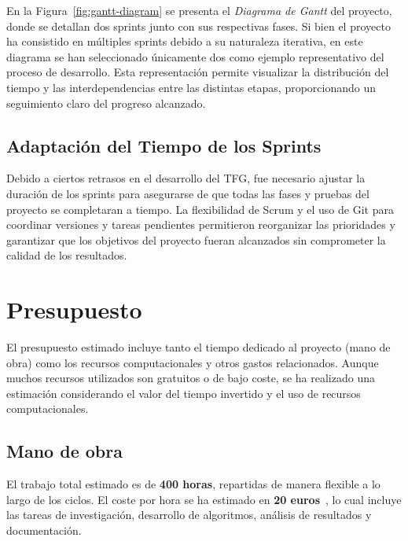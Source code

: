En la Figura~\ref{fig:gantt-diagram} se presenta el \textit{Diagrama de Gantt} del proyecto, donde se detallan dos
sprints junto con sus respectivas fases.
Si bien el proyecto ha consistido en múltiples sprints debido a su naturaleza iterativa, en este diagrama se han
seleccionado únicamente dos como ejemplo representativo del proceso de desarrollo.
Esta representación permite visualizar la distribución del tiempo y las interdependencias entre las distintas etapas,
proporcionando un seguimiento claro del progreso alcanzado.

\subsection{Adaptación del Tiempo de los Sprints}\label{subsec:adaptacion-del-tiempo-de-los-sprints}
Debido a ciertos retrasos en el desarrollo del TFG, fue necesario ajustar la duración de los sprints para asegurarse de
que todas las fases y pruebas del proyecto se completaran a tiempo.
La flexibilidad de Scrum y el uso de Git para coordinar versiones y tareas pendientes permitieron reorganizar las
prioridades y garantizar que los objetivos del proyecto fueran alcanzados sin comprometer la calidad de los resultados.

\section{Presupuesto}\label{sec:presupuesto}
El presupuesto estimado incluye tanto el tiempo dedicado al proyecto (mano de obra) como los recursos computacionales y
otros gastos relacionados.
Aunque muchos recursos utilizados son gratuitos o de bajo coste, se ha realizado una estimación considerando el valor
del tiempo invertido y el uso de recursos computacionales.

\subsection{Mano de obra}\label{subsec:mano-de-obra}
El trabajo total estimado es de \textbf{400 horas}, repartidas de manera flexible a lo largo de los ciclos.
El coste por hora se ha estimado en \textbf{20 euros}~\cite{noauthor_salario_nodate}, lo cual incluye las tareas de
investigación, desarrollo de algoritmos, análisis de resultados y documentación.

